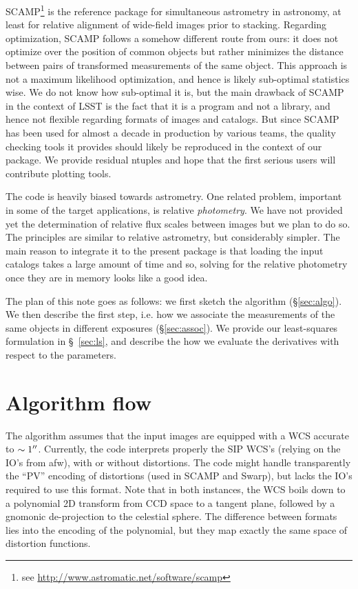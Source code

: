 \documentclass[a4paper,12pt]{scrartcl}
\def\arcsec{\hbox{$^{\prime\prime}$}}
\begin{document}
SCAMP\footnote{see \href{http://www.astromatic.net/software/scamp}{http://www.astromatic.net/software/scamp}} is the reference package for simultaneous astrometry in
astronomy, at least for relative alignment of wide-field images prior
to stacking. Regarding optimization, SCAMP follows a somehow different
route from ours: it does not optimize over the position of common
objects but rather minimizes the distance between pairs of transformed
measurements of the same object. This approach is not a maximum
likelihood optimization, and hence is likely sub-optimal statistics
wise. We do not know how sub-optimal it is, but the main drawback of
SCAMP in the context of LSST is the fact that it is a program and not
a library, and hence not flexible regarding formats of images and
catalogs.  But since SCAMP has been used for almost a decade in
production by various teams, the quality checking tools it provides
should likely be reproduced in the context of our package. We provide
residual ntuples and hope that the first serious users will contribute
plotting tools.

The code is heavily biased towards astrometry. One related problem,
important in some of the target applications, is relative {\it
  photometry}.  We have not provided yet the determination of relative
flux scales between images but we plan to do so. The principles are
similar to relative astrometry, but considerably simpler. The main reason
to integrate it to the present package is that loading the input catalogs
takes a large amount of time and so, solving for the relative photometry
once they are in memory looks like a good idea.


The plan of this note goes as follows: we first sketch the algorithm
(\S \ref{sec:algo}). We then describe the first step, i.e. how we
associate the measurements of the same objects in different exposures (\S \ref{sec:assoc}). We provide our least-squares formulation in \S~\ref{sec:ls},
and describe the how we evaluate the derivatives with respect to the parameters.


\section{Algorithm flow \label{sec:algo}}
The algorithm assumes that the input images are equipped with a WCS
accurate to $\sim 1\arcsec$. Currently, the code interprets properly
the SIP WCS's (relying on the IO's from afw), with or without
distortions. The code might handle transparently the ``PV'' encoding
of distortions (used in SCAMP and Swarp), but lacks the 
IO's required to use this format.
Note that in both instances, the WCS boils down to a polynomial 2D
transform from CCD space to a tangent plane, followed by a gnomonic
de-projection to the celestial sphere.  The difference between formats
lies into the encoding of the polynomial, but they map exactly
the same space of distortion functions. 
\end{document}
